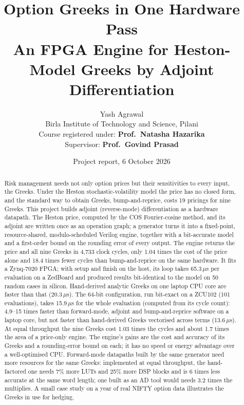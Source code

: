 \documentclass[11pt,a4paper]{article}
\title{\vspace{-1cm}\textbf{Option Greeks in One Hardware Pass}\\[4pt]
\large An FPGA Engine for Heston-Model Greeks by Adjoint Differentiation}
\author{Yash Agrawal\\[2pt]
\small Birla Institute of Technology and Science, Pilani\\[8pt]
\small Course registered under: \textbf{Prof.\ Natasha Hazarika}\\
\small Supervisor: \textbf{Prof.\ Govind Prasad}}
\date{\small Project report, 6 October 2026}
\begin{document}
\maketitle

\begin{abstract}
\noindent
Risk management needs not only option prices but their sensitivities to every
input, the Greeks. Under the Heston stochastic-volatility model the price has no
closed form, and the standard way to obtain Greeks, bump-and-reprice, costs 19
pricings for nine Greeks. This project builds adjoint (reverse-mode)
differentiation as a hardware datapath. The Heston price, computed by the COS
Fourier-cosine method, and its adjoint are written once as an operation graph; a
generator turns it into a fixed-point, resource-shared, modulo-scheduled Verilog
engine, together with a bit-accurate model and a first-order bound on the rounding
error of every output. The engine returns the price and all nine Greeks in 4,733 clock cycles,
only 1.04 times the cost of the price alone and 18.4 times fewer cycles than
bump-and-reprice on the same hardware. It fits a Zynq-7020 FPGA; with setup and finish
on the host, its loop takes 65.3\,$\mu$s per evaluation on a ZedBoard and produced
results bit-identical to the model on 50 random cases in silicon. Hand-derived
analytic Greeks on one laptop CPU core are faster than that (20.3\,$\mu$s). The 64-bit
configuration, run bit-exact on a ZCU102 (101 evaluations), takes 15.9\,$\mu$s for the
whole evaluation (computed from its cycle count): 4.9--15 times faster than forward-mode,
adjoint and bump-and-reprice software on a laptop core, but not faster than hand-derived
Greeks vectorised across terms (13.6\,$\mu$s). At equal throughput the nine Greeks cost 1.03
times the cycles and about 1.7 times the area of a price-only engine. The engine's gains are
the cost and accuracy of its Greeks and a rounding-error bound on each; it has no speed or
energy advantage over a well-optimised CPU. Forward-mode datapaths built by the same
generator need more resources for the same Greeks: implemented at equal throughput, the
hand-factored one needs 7\% more LUTs and 25\% more DSP blocks and is 6 times less accurate
at the same word length; one built as an AD tool would needs 3.2 times the multiplies. A small case study on a year of real NIFTY option data illustrates the
Greeks in use for hedging.
\end{abstract}

\tableofcontents
\newpage
\end{document}
